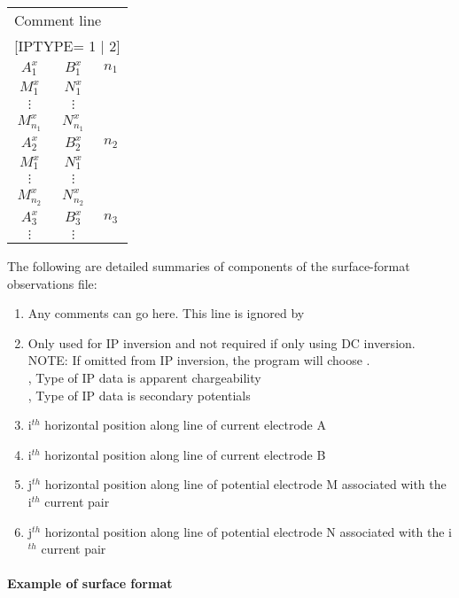 \begin{fileExample}
\begin{tabular}{|ccc|}
\hline
\multicolumn{3}{|l|}{Comment line} \\
\multicolumn{3}{|l|}{[IPTYPE= 1 | 2]} \\
$A_1^x$ & $B_1^x$ &  $n_1$ \\
$M_1^x$ & $N_1^x$ &   \\
$\vdots$ & $\vdots$ & \\
$M_{n_1}^x$ & $N_{n_1}^x$ &  \\ 
$A_2^x$ & $B_2^x$ & $n_2$ \\
$M_1^x$ & $N_1^x$  &  \\
$\vdots$ & $\vdots$ & \\
$M_{n_2}^x$ & $N_{n_2}^x$ & \\ 
$A_3^x$ & $B_3^x$ & $n_3$  \\
$\vdots$ & $\vdots$ & \\
\hline
\end{tabular}
\end{fileExample}

The following are detailed summaries of components of the surface-format observations file:
\begin{enumerate}
\item[\codeName{Comment Line}] Any comments can go here. This line is ignored by 
\item[\codeName{IPTYPE}] Only used for IP inversion and not required if only using DC inversion. NOTE: If omitted from IP inversion, the program will choose . \\
     , Type of IP data is apparent chargeability \\
		 , Type of IP data is secondary potentials
%
\item[\codeName{A$_i^x$}] i$^{th}$ horizontal position along line of current electrode A
\item[\codeName{B$_i^x$}] i$^{th}$ horizontal position along line of current electrode B
\item[\codeName{M$_j^x$}] j$^{th}$ horizontal position along line of potential electrode M associated with the i$^{th}$ current pair
\item[\codeName{N$_j^x$}] j$^{th}$ horizontal position along line of potential electrode N associated with the i$^{th}$ current pair
\end{enumerate}

\paragraph{Example of surface format} 

